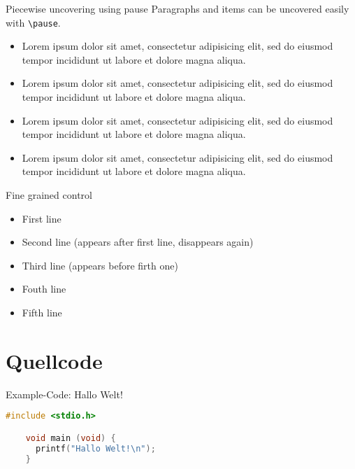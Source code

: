 \documentclass[]{beamer}
\begin{document}
\begin{frame}{Piecewise uncovering using pause}
  Paragraphs and items can be uncovered easily with \texttt{\textbackslash pause}.
  \pause
  \begin{itemize}
    \item Lorem ipsum dolor sit amet, consectetur adipisicing elit, sed do eiusmod tempor incididunt ut labore et dolore magna aliqua. 
      \pause
    \item Lorem ipsum dolor sit amet, consectetur adipisicing elit, sed do eiusmod tempor incididunt ut labore et dolore magna aliqua. 
      \pause
    \item Lorem ipsum dolor sit amet, consectetur adipisicing elit, sed do eiusmod tempor incididunt ut labore et dolore magna aliqua. 
      \pause
    \item Lorem ipsum dolor sit amet, consectetur adipisicing elit, sed do eiusmod tempor incididunt ut labore et dolore magna aliqua. 
  \end{itemize}
\end{frame}

\begin{frame}{Fine grained control}
  \begin{itemize}
    \item<1-> First line
    \item<2>  Second line (appears after first line, disappears again)
    \item<3-4> Third line (appears before firth one)
    \item<4-> Fouth line
    \item<5-> Fifth line
  \end{itemize}

\end{frame}

\section{Quellcode}

\begin{frame}[fragile]{Example-Code: Hallo Welt!}
  \begin{lstlisting}[language=C,gobble=4]
    #include <stdio.h>

    void main (void) {
      printf("Hallo Welt!\n");
    }
  \end{lstlisting}
\end{frame}
\end{document}
